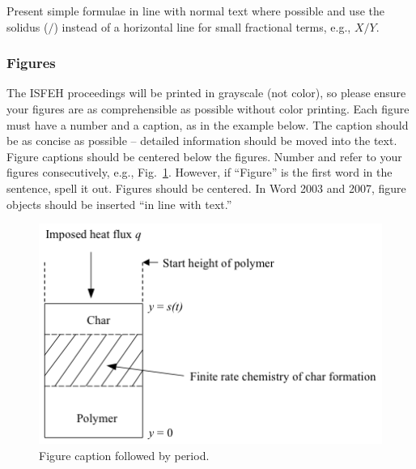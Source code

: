 \documentclass[fleqn,b5paper,10pt]{article}
\begin{document}
Present simple formulae in line with normal text where possible and use the solidus ($/$) instead of a horizontal line for small fractional terms, e.g., $X/Y$.

\subsubsection*{Figures}

The ISFEH proceedings will be printed in grayscale (not color), so please ensure your figures are as comprehensible as possible without color printing. Each figure must have a number and a caption, as in the example below. The caption should be as concise as possible -- detailed information should be moved into the text. Figure captions should be centered below the figures. Number and refer to your figures consecutively, e.g., Fig.~\ref{fig_pyrolysis_model}. However, if ``Figure'' is the first word in the sentence, spell it out. Figures should be centered. In Word 2003 and 2007, figure objects should be inserted ``in line with text.''
\begin{figure}[h!]
\centering
\includegraphics[width=.5\linewidth]{isfeh_fig1.png}
\caption{Figure caption followed by period.}
\label{fig_pyrolysis_model}
\end{figure}
\end{document}
